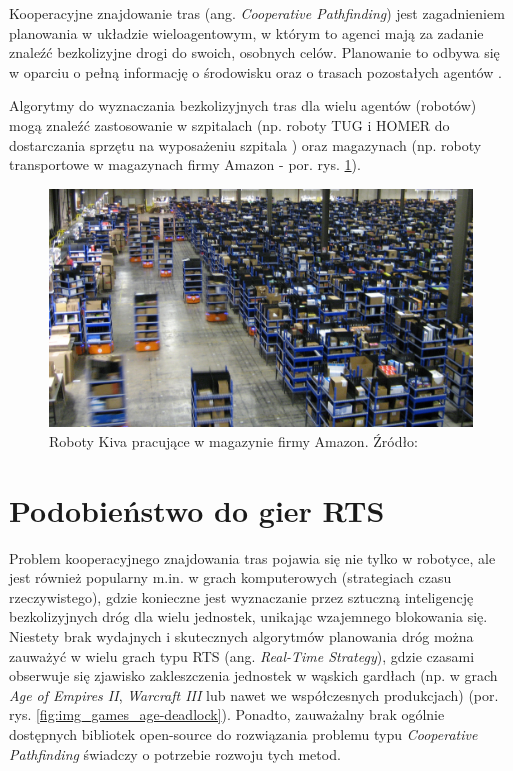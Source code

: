Kooperacyjne znajdowanie tras (ang. {\it Cooperative Pathfinding}) jest zagadnieniem planowania w układzie wieloagentowym, w którym to agenci mają za zadanie znaleźć bezkolizyjne drogi do swoich, osobnych celów. Planowanie to odbywa się w oparciu o pełną informację o środowisku oraz o trasach pozostałych agentów \cite{cooppath}.

Algorytmy do wyznaczania bezkolizyjnych tras dla wielu agentów (robotów) mogą znaleźć zastosowanie w szpitalach (np. roboty TUG i HOMER do dostarczania sprzętu na wyposażeniu szpitala \cite{tughomer}) oraz magazynach (np. roboty transportowe w magazynach firmy Amazon - por. rys. \ref{fig:image_kiva_amazon}).

\begin{figure}[H]
	\centering
	\includegraphics[width=14cm]{img/kiva-amazon}
	\caption{Roboty Kiva pracujące w magazynie firmy Amazon. Źródło: \cite{amazonkiva}}
	\label{fig:image_kiva_amazon}
\end{figure}

\section{Podobieństwo do gier RTS}
Problem kooperacyjnego znajdowania tras pojawia się nie tylko w robotyce, ale jest również popularny m.in. w grach komputerowych (strategiach czasu rzeczywistego), gdzie konieczne jest wyznaczanie przez sztuczną inteligencję bezkolizyjnych dróg dla wielu jednostek, unikając wzajemnego blokowania się. Niestety brak wydajnych i skutecznych algorytmów planowania dróg można zauważyć w wielu grach typu RTS (ang. {\it Real-Time Strategy}), gdzie czasami obserwuje się zjawisko zakleszczenia jednostek w wąskich gardłach (np. w grach {\it Age of Empires II}, {\it Warcraft III} lub nawet we współczesnych produkcjach) \cite{efficient_coop_pathplanning} (por. rys. \ref{fig:img_games_age-deadlock}). Ponadto, zauważalny brak ogólnie dostępnych bibliotek open-source do rozwiązania problemu typu {\it Cooperative Pathfinding} świadczy o potrzebie rozwoju tych metod.

